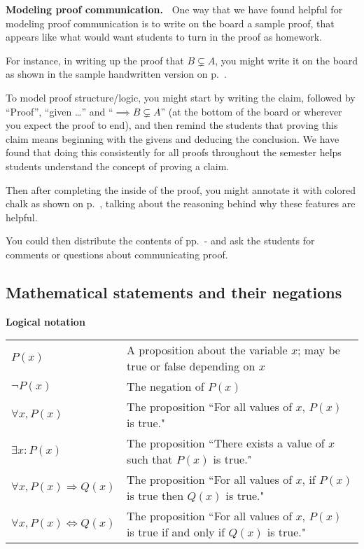 \documentclass[11pt]{article}
\newenvironment{bignote}[1][Instructor note]%
	{\begin{mdframed}\raggedright{\bf #1.~}}
	{\end{mdframed}}
\theoremstyle{definition}
\begin{document}
\begin{bignote}[Modeling proof communication]
One way that we have found helpful for modeling proof communication is to write on the board a sample proof, that appears like what would want students to turn in the proof as homework. 

For instance, in writing up the proof that $B\subsetneq A$, you might write it on the board as shown in the sample handwritten version on p.~\pageref{s: sample handwritten proof}.  

To model proof structure/logic, you might start by writing the claim, followed by ``Proof'', ``given \dots'' and ``$\implies B\subsetneq A$'' (at the bottom of the board or wherever you expect the proof to end), and then remind the students that proving this claim means beginning with the givens and deducing the conclusion. We have found that doing this consistently for all proofs throughout the semester helps students understand the concept of proving a claim.

Then after completing the inside of the proof, you might annotate it with colored chalk as shown on p.~\pageref{s: good proof communication}, talking about the reasoning behind why these features are helpful.

You could then distribute the contents of pp.~\pageref{s: sample handwritten proof}-\pageref{s: good proof communication} and ask the students for comments or questions about communicating proof.
\end{bignote}

\subsection{Mathematical statements and their negations}
\label{s: statements and negations}

{\bf Logical notation}

\begin{tabular}{L{1in}L{5in}}
$P(x)$ & A proposition about the variable $x$; may be true or false depending on $x$ \\

$\neg P(x)$ & The negation of $P(x)$ \\

$\forall x, P(x)$ & The proposition ``For all values of $x$, $P(x)$ is true." \\

$\exists x: P(x)$ & The proposition ``There exists a value of $x$ such that $P(x)$ is true." \\

$\forall x, P(x) \Rightarrow Q(x)$ & The proposition ``For all values of $x$, if $P(x)$ is true then $Q(x)$ is true."\\

$\forall x, P(x) \Leftrightarrow Q(x)$ & The proposition ``For all values of $x$, $P(x)$ is true if and only if $Q(x)$ is true." 
\end{tabular}
\end{document}
